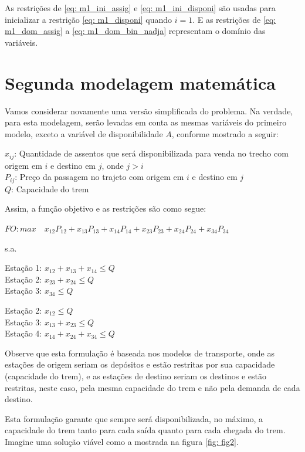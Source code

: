 As restrições de \ref{eq: m1_ini_assig} e \ref{eq: m1_ini_disponi} são usadas para inicializar a restrição \ref{eq: m1_disponi} quando \(i = 1\). E as restrições de \ref{eq: m1_dom_assig} a \ref{eq: m1_dom_bin_nadja} representam o domínio das variáveis.

\section{Segunda modelagem matemática}\label{sec:modelo2}

Vamos considerar novamente uma versão simplificada do problema. Na verdade, para esta modelagem, serão levadas em conta as mesmas variáveis do primeiro modelo, exceto a variável de disponibilidade \(A\), conforme mostrado a seguir:

\noindent $x_{ij}$: Quantidade de assentos que será disponibilizada para venda no trecho com origem em $i$ e destino em $j$, onde $j>i$ \\
\noindent $P_{ij}$: Preço da passagem no trajeto com origem em $i$ e destino em $j$ \\
\noindent $Q$: Capacidade do trem

\noindent Assim, a função objetivo e as restrições são como segue:

$FO: max \quad x_{12}P_{12} + x_{13}P_{13} + x_{14}P_{14} + x_{23}P_{23} + x_{24}P_{24} + x_{34}P_{34}$

s.a.


Estação 1: $x_{12} + x_{13} + x_{14} \leq Q $ \\
\indent Estação 2: $x_{23} + x_{24}  \leq  Q $ \\
\indent Estação 3: $x_{34} \leq Q $


Estação 2: $x_{12} \leq Q $ \\
\indent Estação 3: $x_{13} + x_{23}  \leq  Q $ \\
\indent Estação 4: $x_{14} + x_{24} + x_{34} \leq Q $

Observe que esta formulação é baseada nos modelos de transporte, onde as estações de origem seriam os depósitos e estão restritas por sua capacidade (capacidade do trem), e as estações de destino seriam os destinos e estão restritas, neste caso, pela mesma capacidade do trem e não pela demanda de cada destino.

Esta formulação garante que sempre será disponibilizada, no máximo, a capacidade do trem tanto para cada saída quanto para cada chegada do trem. Imagine uma solução viável como a mostrada na figura \ref{fig: fig2}.


